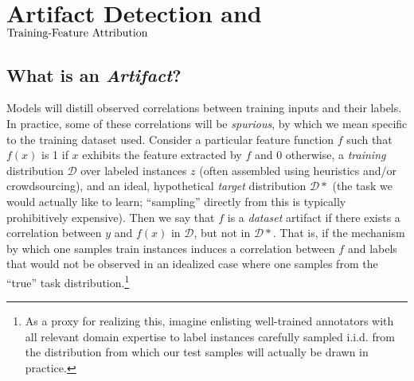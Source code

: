 \documentclass[11pt]{article}
\begin{document}
\section{Artifact Detection and $\text{Training-Feature Attribution}$}


\subsection{What is an \emph{Artifact}?}
\label{sec3.1}
Models will distill observed correlations between training inputs and their labels.
In practice, some of these correlations will be \emph{spurious}, by which we mean specific to the training dataset used.
Consider a particular feature function $f$ such that $f(x)$ is 1 if $x$ exhibits the feature extracted by $f$ and 0 otherwise, a \emph{training} distribution $\mathcal{D}$ over labeled instances $z$ (often assembled using heuristics and/or crowdsourcing), and an ideal, hypothetical \emph{target} distribution $\mathcal{D*}$ (the task we would actually like to learn; ``sampling'' directly from this is typically prohibitively expensive). 
Then we say that $f$ is a \textit{dataset} artifact if there exists a correlation between $y$ and $f(x)$ in $\mathcal{D}$, but not in $\mathcal{D}*$.
That is, if the mechanism by which one samples train instances induces a correlation between $f$ and labels that would not be observed in an idealized case where one samples from the ``true'' task distribution.\footnote{As a proxy for realizing this, imagine enlisting well-trained annotators with all relevant domain expertise to label instances carefully sampled i.i.d. from the distribution from which our test samples will actually be drawn in practice.}
\end{document}
